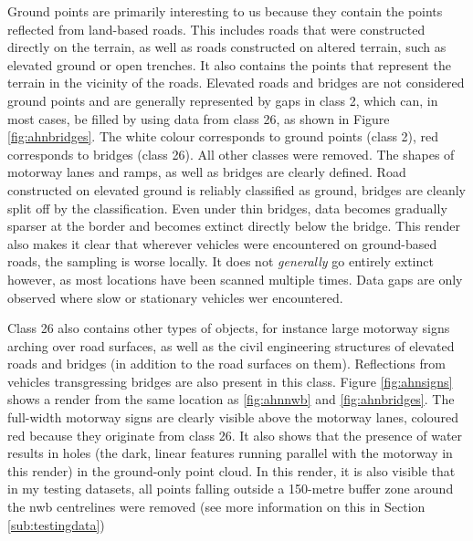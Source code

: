 Ground points are primarily interesting to us because they contain the points reflected from land-based roads. This includes roads that were constructed directly on the terrain, as well as roads constructed on altered terrain, such as elevated ground or open trenches. It also contains the points that represent the terrain in the vicinity of the roads. Elevated roads and bridges are not considered ground points and are generally represented by gaps in class 2, which can, in most cases, be filled by using data from class 26, as shown in Figure \ref{fig:ahnbridges}. The white colour corresponds to ground points (class 2), red corresponds to bridges (class 26). All other classes were removed. The shapes of motorway lanes and ramps, as well as bridges are clearly defined. Road constructed on elevated ground is reliably classified as ground, bridges are cleanly split off by the classification. Even under thin bridges, data becomes gradually sparser at the border and becomes extinct directly below the bridge. This render also makes it clear that wherever vehicles were encountered on ground-based roads, the sampling is worse locally. It does not \textit{generally} go entirely extinct however, as most locations have been scanned multiple times. Data gaps are only observed where slow or stationary vehicles wer encountered.

Class 26 also contains other types of objects, for instance large motorway signs arching over road surfaces, as well as the civil engineering structures of elevated roads and bridges (in addition to the road surfaces on them). Reflections from vehicles transgressing bridges are also present in this class. Figure \ref{fig:ahnsigns} shows a render from the same location as \ref{fig:ahnnwb} and \ref{fig:ahnbridges}. The full-width motorway signs are clearly visible above the motorway lanes, coloured red because they originate from class 26. It also shows that the presence of water results in holes (the dark, linear features running parallel with the motorway in this render) in the ground-only point cloud. In this render, it is also visible that in my testing datasets, all points falling outside a 150-metre buffer zone around the \ac{nwb} centrelines were removed (see more information on this in Section \ref{sub:testingdata})

